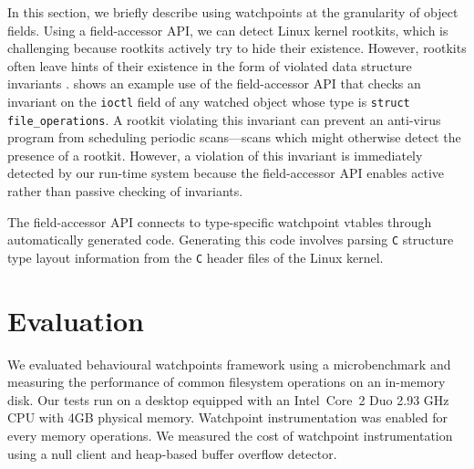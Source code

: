 \documentclass[letterpaper,twocolumn,10pt]{article}
\begin{document}
In this section, we briefly describe using watchpoints at the granularity of object fields. Using a field-accessor API, we can detect Linux kernel rootkits, which is challenging because rootkits actively try to hide their existence. However, rootkits often leave hints of their existence in the form of violated data structure invariants \cite{GibraltarKernelInvariants,OSck}. 
 shows an example use of the field-accessor API that checks an invariant on the \texttt{ioctl} field of any watched object whose type is \texttt{struct file\_operations}. A rootkit violating this invariant can prevent an anti-virus program from scheduling periodic scans---scans which might otherwise detect the presence of a rootkit. However, a violation of this invariant is immediately detected by our run-time system because the field-accessor API enables active rather than passive checking of invariants.

The field-accessor API connects to type-specific watchpoint vtables through automatically generated code. Generating this code involves parsing \texttt{C} structure type layout information from the \texttt{C} header files of the Linux kernel.

\section{Evaluation}

We evaluated behavioural watchpoints framework using a microbenchmark and measuring the performance of common filesystem operations on an in-memory disk. Our tests run on a desktop equipped with an Intel\textregistered\ Core\texttrademark\ 2 Duo 2.93 GHz CPU with 4GB physical memory. Watchpoint instrumentation was enabled for every memory operations. We measured the cost of watchpoint instrumentation using a null client and heap-based buffer overflow detector. %
\end{document}

